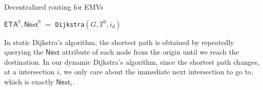%
\begin{algorithm}[t]
    \caption{Decentralized routing for EMVs}
    \label{alg:ETA_prepopulation}
    \SetEndCharOfAlgoLine{}
    $\mathsf{ETA}^0, \mathsf{Next}^0$ $=$ \texttt{Dijkstra}$(G, T^0, i_d)$\;
\end{algorithm}
\begin{remark}
    In static Dijkstra's algorithm, the shortest path is obtained by repeatedly querying the $\mathsf{Next}$ attribute of each node from the origin until we reach the destination. In our dynamic Dijkstra's algorithm, since the shortest path changes, at a intersection $i$, we only care about the immediate next intersection to go to, which is exactly $\mathsf{Next}_i$.
\end{remark}

